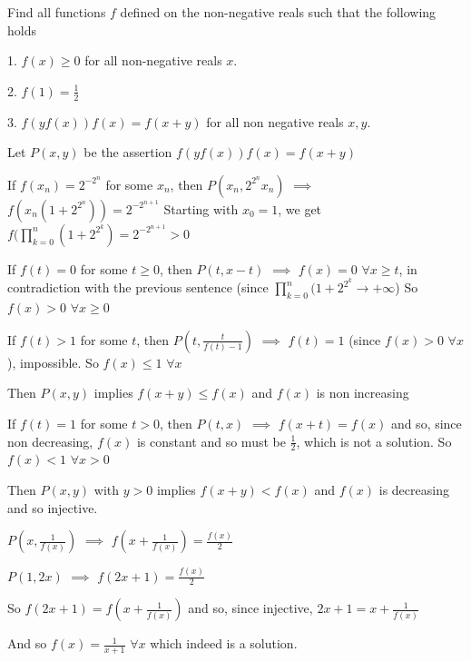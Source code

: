\begin{solution}
	\begin{tcolorbox}Find all functions $f$ defined on the non-negative reals such that the following holds

1. $f(x) \ge 0$ for all non-negative reals $x$.

2. $f(1) = \frac{1}{2}$

3. $f(yf(x))f(x) = f(x+y)$ for all non negative reals $x,y$.\end{tcolorbox}
Let $P(x,y)$ be the assertion $f(yf(x))f(x)=f(x+y)$

If $f(x_n)=2^{-2^n}$ for some $x_n$, then $P(x_n,2^{2^n}x_n)$ $\implies$ $f(x_n(1+2^{2^n}))=2^{-2^{n+1}}$
Starting with $x_0=1$, we get $f(\prod_{k=0}^n(1+2^{2^k})=2^{-2^{n+1}}>0$

If $f(t)=0$ for some $t\ge 0$, then $P(t,x-t)$ $\implies$ $f(x)=0$ $\forall x\ge t$, in contradiction with the previous sentence (since $\prod_{k=0}^n(1+2^{2^k}\to+\infty$)
So $f(x)>0$ $\forall x\ge 0$

If $f(t)>1$ for some $t$, then $P(t,\frac t{f(t)-1})$ $\implies$ $f(t)=1$ (since $f(x)>0$ $\forall x$), impossible. So $f(x)\le 1$ $\forall x$

Then $P(x,y)$ implies $f(x+y)\le f(x)$ and $f(x)$ is non increasing

If $f(t)=1$ for some $t>0$, then $P(t,x)$ $\implies$ $f(x+t)=f(x)$ and so, since non decreasing, $f(x)$ is constant and so must be $\frac 12$, which is not a solution. So $f(x)<1$ $\forall x>0$

Then $P(x,y)$ with $y>0$ implies $f(x+y)< f(x)$ and $f(x)$ is decreasing and so injective.

$P(x,\frac 1{f(x)})$ $\implies$ $f(x+\frac 1{f(x)})=\frac{f(x)}2$

$P(1,2x)$ $\implies$ $f(2x+1)=\frac{f(x)}2$

So $f(2x+1)=f(x+\frac 1{f(x)})$ and so, since injective, $2x+1=x+\frac 1{f(x)}$

And so $\boxed{f(x)=\frac 1{x+1}}$ $\forall x$ which indeed is a solution.
\end{solution}



